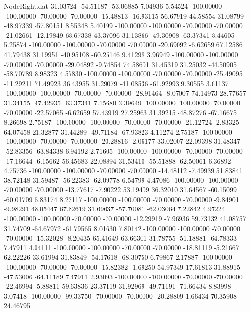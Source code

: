 \begin{filecontents}{NodeRight.dat}
  31.03724  -54.51187  -53.06885     7.04936    5.54524 -100.00000 -100.00000  -70.00000  -70.00000  -15.48813  -16.93115   56.67919   44.58554
  31.08799  -48.97339  -57.80151     8.55348    5.40199 -100.00000 -100.00000  -70.00000  -70.00000  -21.02661  -12.19849   68.67338   43.37096
  31.13866  -49.30908  -63.37341     8.44605    5.25874 -100.00000 -100.00000  -70.00000  -70.00000  -20.69092   -6.62659   67.12586   41.79438
  31.19951  -40.95108  -60.25146     9.41298    3.96949 -100.00000 -100.00000  -70.00000  -70.00000  -29.04892   -9.74854   74.58601   31.45319
  31.25032  -44.50905  -58.70789     8.98323    4.57830 -100.00000 -100.00000  -70.00000  -70.00000  -25.49095  -11.29211   71.49923   36.43955
  31.29079  -41.08536  -61.92993     9.30555    3.61137 -100.00000 -100.00000  -70.00000  -70.00000  -28.91464   -8.07007   74.14973   28.77657
  31.34155  -47.42935  -63.37341     7.15680    3.39649 -100.00000 -100.00000  -70.00000  -70.00000  -22.57065   -6.62659   57.43919   27.25963
  31.39215  -48.87276  -67.16675     8.26698    2.75187 -100.00000 -100.00000  -70.00000  -70.00000  -21.12724   -2.83325   64.07458   21.32877
  31.44289  -49.71184  -67.93823     4.11274    2.75187 -100.00000 -100.00000  -70.00000  -70.00000  -20.28816   -2.06177   33.02007   22.09398
  31.48347  -52.83356  -63.84338     6.94192    2.71605 -100.00000 -100.00000  -70.00000  -70.00000  -17.16644   -6.15662   56.45683   22.08894
  31.53410  -55.51888  -62.50061     6.36892    4.75736 -100.00000 -100.00000  -70.00000  -70.00000  -14.48112   -7.49939   51.83841   38.72148
  31.59487  -56.22383  -62.09778     6.54799    4.47086 -100.00000 -100.00000  -70.00000  -70.00000  -13.77617   -7.90222   53.19409   36.32010
  31.64567  -60.15099  -60.01709     5.83174    8.23117 -100.00000 -100.00000  -70.00000  -70.00000   -9.84901   -9.98291   48.05447   67.82619
  31.69637  -57.70081  -62.03064     7.22842    4.97224 -100.00000 -100.00000  -70.00000  -70.00000  -12.29919   -7.96936   59.73132   41.08757
  31.74709  -54.67972  -61.79565     8.01630    7.80142 -100.00000 -100.00000  -70.00000  -70.00000  -15.32028   -8.20435   65.41649   63.66301
  31.78755  -51.18881  -64.78333     7.47911    4.04111 -100.00000 -100.00000  -70.00000  -70.00000  -18.81119   -5.21667   62.22226   33.61994
  31.83849  -54.17618  -68.30750     6.79867    2.17887 -100.00000 -100.00000  -70.00000  -70.00000  -15.82382   -1.69250   54.97349   17.61813
  31.88915  -47.53006  -64.11189     7.47911    2.93093 -100.00000 -100.00000  -70.00000  -70.00000  -22.46994   -5.88811   59.63836   23.37119
  31.92969  -49.71191  -71.66434     8.83998    3.07418 -100.00000  -99.33750  -70.00000  -70.00000  -20.28809    1.66434   70.35908   24.46795

\end{filecontents}
